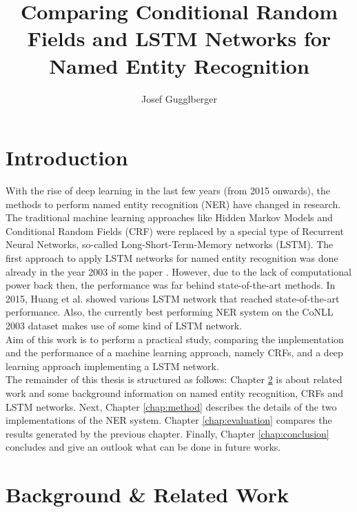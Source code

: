 \documentclass[12pt]{book}
\begin{document}
    \title{Comparing Conditional Random Fields and LSTM Networks for Named Entity Recognition}
    \author{Josef Gugglberger}
 
    \beforepreface

 	\afterpreface
 	
 	
    \chapter{Introduction}
    
    With the rise of deep learning in the last few years (from 2015 onwards), the methods to perform named entity recognition (NER) have changed in research. The traditional machine learning approaches like Hidden Markov Models and Conditional Random Fields (CRF) were replaced by a special type of Recurrent Neural Networks, so-called Long-Short-Term-Memory networks (LSTM). The first approach to apply LSTM networks for named entity recognition was done already in the year 2003 in the paper \cite{hammerton-2003-named}. However, due to the lack of computational power back then, the performance was far behind state-of-the-art methods. In 2015, Huang et al. \cite{huang2015bidirectional} showed various LSTM network that reached state-of-the-art performance. Also, the currently best performing NER system \cite{akbik2018contextual} on the CoNLL 2003 dataset makes use of some kind of LSTM network.\\
    
    Aim of this work is to perform a practical study, comparing the implementation and the performance of a machine learning approach, namely CRFs, and a deep learning approach implementing a LSTM network.\\
    
    The remainder of this thesis is structured as follows: Chapter \ref{chap:backround} is about related work and some background information on named entity recognition, CRFs and LSTM networks. Next, Chapter \ref{chap:method} describes the details of the two implementations of the NER system. Chapter \ref{chap:evaluation} compares the results generated by the previous chapter. Finally, Chapter \ref{chap:conclusion} concludes and give an outlook what can be done in future works.
   
	\chapter{Background \& Related Work}
	\label{chap:backround}
	
\end{document}
